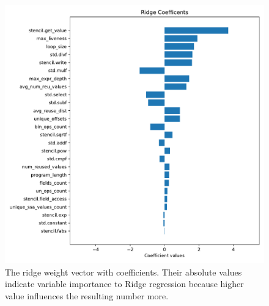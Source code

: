 \documentclass[sigplan,\review anonymous]{acmart}
\begin{document}
\begin{figure}
  \centering
  \includegraphics[width=\columnwidth]{images/ridge_var_importance.pdf}
  \caption{The ridge weight vector with coefficients. Their absolute
  values indicate variable importance to Ridge regression because
  higher value influences the resulting number more.}
  \label{fig:ridge_var_importance}
\end{figure}
\end{document}

